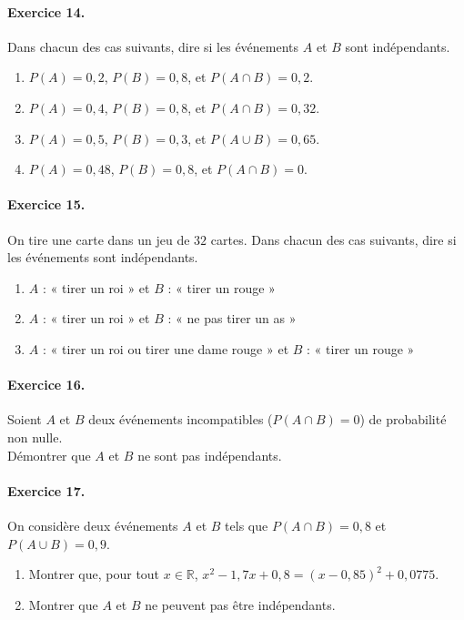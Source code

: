 \documentclass[11pt]{article}
\begin{document}
\paragraph{Exercice 14.} Dans chacun des cas suivants, dire si les événements
$A$ et $B$ sont indépendants.
\begin{enumerate}
  \item $P(A)=0,2$, $P(B)=0,8$, et $P(A\cap B)=0,2$.
  \item $P(A)=0,4$, $P(B)=0,8$, et $P(A\cap B)=0,32$.
  \item $P(A)=0,5$, $P(B)=0,3$, et $P(A\cup B)=0,65$.
  \item $P(A)=0,48$, $P(B)=0,8$, et $P(A\cap B)=0$.
\end{enumerate}

\paragraph{Exercice 15.} On tire une carte dans un jeu de $32$ cartes. Dans
chacun des cas suivants, dire si les événements sont indépendants.
\begin{enumerate}
  \item $A$ : « tirer un roi » et $B$ : « tirer un rouge »
  \item $A$ : « tirer un roi » et $B$ : « ne pas tirer un as »
  \item $A$ : « tirer un roi ou tirer une dame rouge » et $B$ : « tirer un rouge »
\end{enumerate}

\paragraph{Exercice 16.} Soient $A$ et $B$ deux événements incompatibles
($P(A\cap B)=0$) de probabilité non nulle.\\Démontrer que $A$ et $B$ ne sont pas
indépendants.

\paragraph{Exercice 17.} On considère deux événements $A$ et $B$ tels que
$P(A\cap B)=0,8$ et $P(A\cup B)=0,9$.
\begin{enumerate}
  \item Montrer que, pour tout $x\in\mathbb{R}$,
    $x^2-1,7x+0,8=(x-0,85)^2+0,0775$.
  \item Montrer que $A$ et $B$ ne peuvent pas être indépendants.
\end{enumerate}
\end{document}
